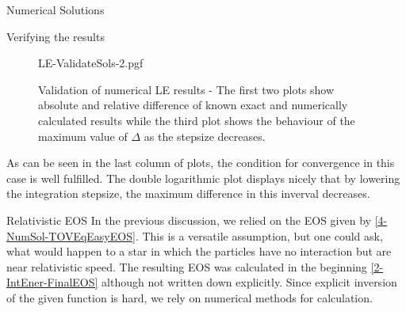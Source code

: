 \begin{section}{Numerical Solutions}
\begin{subsection}{Verifying the results}
\begin{figure}[H]
	\centering
	{LE-ValidateSols-2.pgf}
	\caption[Validation of numerical LE results]{Validation of numerical LE results - The first two plots show absolute and relative difference of known exact and numerically calculated results while the third plot shows the behaviour of the maximum value of $\Delta$ as the stepsize decreases.}
	\label{4-NumSol-ValidateLEResults}
\end{figure}\noindent
As can be seen in the last column of plots, the condition for convergence in this case is well fulfilled. 
The double logarithmic plot displays nicely that by lowering the integration stepsize, the maximum difference in this inverval decreases.
% 
\end{subsection}
%
%
\begin{subsection}{Relativistic EOS}
In the previous discussion, we relied on the EOS given by \ref{4-NumSol-TOVEqEasyEOS}. This is a versatile assumption, but one could ask, what would happen to a star in which the particles have no interaction but are near relativistic speed. The resulting EOS was calculated in the beginning \ref{2-IntEner-FinalEOS} although not written down explicitly. Since explicit inversion of the given function is hard, we rely on numerical methods for calculation.

\end{subsection}
\end{section}
